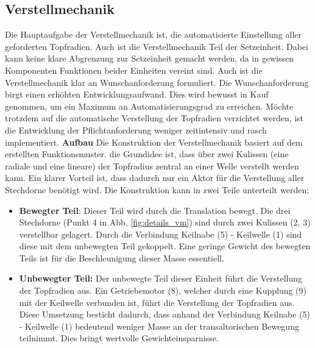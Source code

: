 \subsection{Verstellmechanik}
Die Hauptaufgabe der Verstellmechanik ist, die automatisierte Einstellung aller geforderten Topfradien. Auch ist die Verstellmechanik Teil der Setzeinheit. Dabei kann keine klare Abgrenzung zur Setzeinheit gemacht werden, da in gewissen Komponenten Funktionen beider Einheiten vereint sind. Auch ist die Verstellmechanik klar an Wunschanforderung formuliert. Die Wunschanforderung birgt einen erhöhten Entwicklungsaufwand. Dies wird bewusst in Kauf genommen, um ein Maximum an Automatisierungsgrad zu erreichen. Möchte trotzdem auf die automatische Verstellung der Topfradien verzichtet werden, ist die Entwicklung der Pflichtanforderung weniger zeitintensiv und rasch implementiert.
\newline
\newline
\textbf{Aufbau}
\newline
Die Konstruktion der Verstellmechanik basiert auf dem erstellten Funktionsmuster. die Grundidee ist, dass über zwei Kulissen (eine radiale und eine lineare) der Topfradius zentral an einer Welle verstellt werden kann. Ein klarer Vorteil ist, dass dadurch nur ein Aktor für die Verstellung aller Stechdorne benötigt wird. Die Konstruktion kann in zwei Teile unterteilt werden:
\begin{itemize}
	\item \textbf{Bewegter Teil}: Dieser Teil wird durch die Translation bewegt. Die drei Stechdorne (Punkt 4 in Abb. \ref{fig:details_vm}) sind durch zwei Kulissen (2, 3) verstellbar gelagert. Durch die Verbindung Keilnabe (5) - Keilwelle (1) sind diese mit dem unbewegten Teil gekoppelt. Eine geringe Gewicht des bewegten Teils ist für die Beschleunigung dieser Masse essentiell.
	
	\item \textbf{Unbewegter Teil:} Der unbewegte Teil dieser Einheit führt die Verstellung der Topfradien aus. Ein Getriebemotor (8), welcher durch eine Kupplung (9) mit der Keilwelle verbunden ist, führt die Verstellung der Topfradien aus. Diese Umsetzung besticht dadurch, dass anhand der Verbindung Keilnabe (5) - Keilwelle (1) bedeutend weniger Masse an der transaltorischen Bewegung teilnimmt. Dies bringt wertvolle Gewichteinsparnisse.
\end{itemize}
